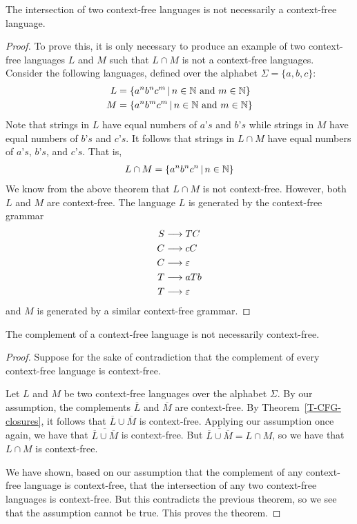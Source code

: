 \begin{theorem}
The intersection of two context-free languages is not necessarily a
context-free language.
\end{theorem}
\begin{proof}
To prove this, it is only necessary to produce an example of two
context-free languages $L$ and $M$ such that $L\cap M$ is not a
context-free languages.  Consider the following languages, defined
over the alphabet $\Sigma=\{a,b,c\}$:
\begin{align*}
   L&=\{a^nb^nc^m \,|\, n\in{\mathbb N}\text{ and }m\in{\mathbb N}\}\\
   M&=\{a^nb^mc^m \,|\, n\in{\mathbb N}\text{ and }m\in{\mathbb N}\}
\end{align*}
Note that strings in $L$ have equal numbers of $a\text{'}s$ and $b\text{'}s$ while
strings in $M$ have equal numbers of $b\text{'}s$ and $c\text{'}s$.  It follows that
strings in $L\cap M$ have equal numbers of $a\text{'}s$, $b\text{'}s$, and $c\text{'}s$.
That is,
\begin{align*}
   L\cap M=\{a^nb^nc^n\,|\, n\in{\mathbb N}\}
\end{align*}
We know from the above theorem that $L\cap M$ is not context-free.
However, both $L$ and $M$ are context-free.  The language $L$
is generated by the context-free grammar
\begin{align*}
   S &\longrightarrow TC\\
   C &\longrightarrow cC\\
   C &\longrightarrow \varepsilon\\
   T &\longrightarrow aTb\\
   T &\longrightarrow \varepsilon
\end{align*}
and $M$ is generated by a similar context-free grammar.
\end{proof}
\smallskip

\begin{corrolary}
The complement of a context-free language is not necessarily context-free.
\end{corrolary}
\begin{proof}
  Suppose for the sake of contradiction that the complement of every
context-free language is context-free.  

Let $L$ and $M$ be two context-free languages over the alphabet $\Sigma$.
By our assumption, the complements $\overline{L}$ and $\overline{M}$
are context-free.  By Theorem~\ref{T-CFG-closures}, it follows
that $\overline{L}\cup\overline{M}$ is context-free.  Applying our
assumption once again, we have that $\overline{\overline{L}\cup\overline{M}}$
is context-free.
But $\overline{\overline{L}\cup\overline{M}}=L\cap M$, so we have
that $L\cap M$ is context-free.

We have shown, based on our assumption that the complement of any
context-free language is context-free, that the intersection of any
two context-free languages is context-free.  But this contradicts
the previous theorem, so we see that the assumption cannot be true.
This proves the theorem.
\end{proof}


